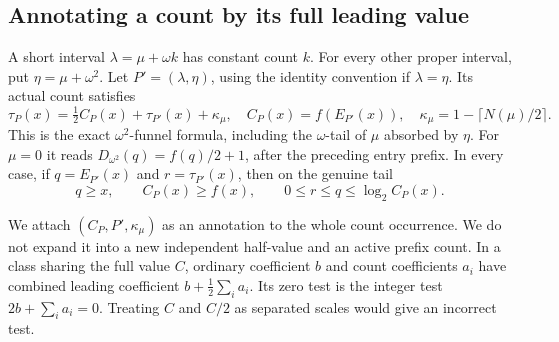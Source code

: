 \subsection{Annotating a count by its full leading value}

A short interval \(\lambda=\mu+\omega k\) has constant count \(k\).
For every other proper interval, put
\(\eta=\mu+\omega^2\). Let \(P'=(\lambda,\eta)\), using the
identity convention if \(\lambda=\eta\). Its actual count satisfies
\begin{equation}\label{eq:count-core}
 \tau_P(x)=\tfrac12 C_P(x)+\tau_{P'}(x)+\kappa_\mu,
 \quad C_P(x)=f(E_{P'}(x)),\quad
 \kappa_\mu=1-\lceil N(\mu)/2\rceil.
\end{equation}
This is the exact \(\omega^2\)-funnel formula, including the
\(\omega\)-tail of \(\mu\) absorbed by \(\eta\).
For \(\mu=0\) it reads \(D_{\omega^2}(q)=f(q)/2+1\), after the
preceding entry prefix. In every case, if \(q=E_{P'}(x)\) and
\(r=\tau_{P'}(x)\), then on the genuine tail
\begin{equation}\label{eq:core-error}
 q\ge x,\qquad C_P(x)\ge f(x),\qquad
 0\le r\le q\le\log_2 C_P(x).
\end{equation}

We attach \((C_P,P',\kappa_\mu)\) as an annotation to the whole count
occurrence. We do not expand it into a new independent half-value and
an active prefix count. In a class sharing the full value \(C\), ordinary
coefficient \(b\) and count coefficients \(a_i\) have combined leading
coefficient \(b+\frac12\sum_i a_i\). Its zero test is the integer test
\(2b+\sum_i a_i=0\). Treating \(C\) and \(C/2\) as separated
scales would give an incorrect test.

